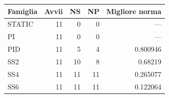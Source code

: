 \begin{tabular}{lrrrr}
\toprule
Famiglia & Avvii & NS & NP & Migliore norma \\
\midrule
STATIC & 11 & 0 & 0 & --- \\
PI & 11 & 0 & 0 & --- \\
PID & 11 & 5 & 4 & 0.800946 \\
SS2 & 11 & 10 & 8 & 0.68219 \\
SS4 & 11 & 11 & 11 & 0.265077 \\
SS6 & 11 & 11 & 11 & 0.122064 \\
\bottomrule
\end{tabular}
